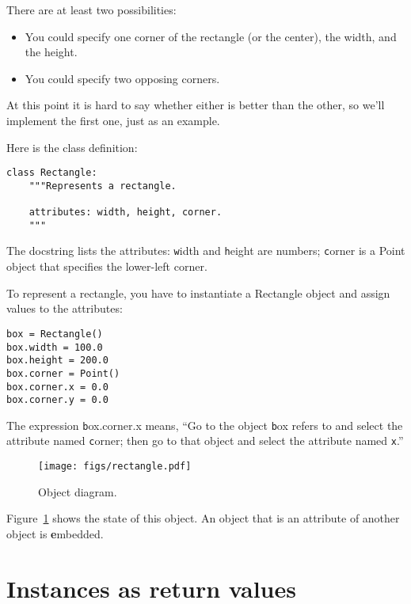 \documentclass[
DIV=11,
fontsize=13,
twoside,
headinclude=false,
titlepage=firstiscover,
abstract=true,
headsepline=true,
footsepline=true,
chapterprefix=true, %
headings=big,
bibliography=totoc,%
captions=tableheading
]{scrbook}
\theoremstyle{definition}
\begin{document}
There are at least two possibilities: 

\begin{itemize}

\item You could specify one corner of the rectangle
(or the center), the width, and the height.

\item You could specify two opposing corners.

\end{itemize}

At this point it is hard to say whether either is better than
the other, so we'll implement the first one, just as an example.

Here is the class definition:

\begin{lstlisting}
class Rectangle:
    """Represents a rectangle. 

    attributes: width, height, corner.
    """
\end{lstlisting}
%
The docstring lists the attributes:  {\texttt width} and
{\texttt height} are numbers; {\texttt corner} is a Point object that
specifies the lower-left corner.

To represent a rectangle, you have to instantiate a Rectangle
object and assign values to the attributes:

\begin{lstlisting}
box = Rectangle()
box.width = 100.0
box.height = 200.0
box.corner = Point()
box.corner.x = 0.0
box.corner.y = 0.0
\end{lstlisting}
%
The expression {\texttt box.corner.x} means,
``Go to the object {\texttt box} refers to and select the attribute named
{\texttt corner}; then go to that object and select the attribute named
{\texttt x}.''

\begin{figure}
\centerline
{\texttt{[image: figs/rectangle.pdf]}}
\caption{Object diagram.}
\label{fig.rectangle}
\end{figure}


Figure~\ref{fig.rectangle} shows the state of this object.
An object that is an attribute of another object is {\textbf embedded}.


\section{Instances as return values}
\end{document}
